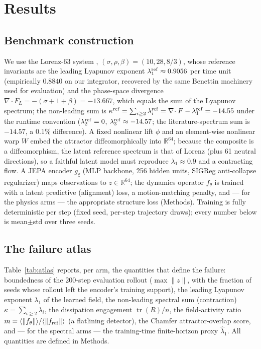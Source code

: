 \documentclass[11pt]{article}
\newcommand{\R}{\mathbb{R}}
\newcommand{\tr}{\operatorname{tr}}
\newcommand{\grad}{\nabla}
\begin{document}
\section{Results}
\label{sec:results}

\subsection{Benchmark construction}
\label{sec:bench}

We use the Lorenz-63 system \cite{lorenz1963deterministic},
$(\sigma,\rho,\beta)=(10,28,8/3)$, whose reference invariants are the
leading Lyapunov exponent $\lambda_1^{\rm ref}\approx 0.9056$ per time
unit (empirically $0.8840$ on our integrator, recovered by the same
Benettin machinery used for evaluation) and the phase-space divergence
$\grad\!\cdot F_L=-(\sigma+1+\beta)=-13.667$, which equals the sum of the
Lyapunov spectrum; the non-leading sum is $\kappa^{\rm ref}=\sum_{i\ge2}
\lambda_i^{\rm ref}=\grad\!\cdot F-\lambda_1^{\rm ref}=-14.55$ under the
runtime convention ($\lambda_2^{\rm ref}=0$, $\lambda_3^{\rm ref}
\approx-14.57$; the literature-spectrum sum is $-14.57$, a $0.1\%$
difference). A fixed nonlinear lift $\phi$ and an element-wise
nonlinear warp $W$ embed the attractor diffeomorphically into $\R^{64}$;
because the composite is a diffeomorphism, the latent reference spectrum
is that of Lorenz (plus 61 neutral directions), so a faithful latent
model must reproduce $\lambda_1\approx0.9$ and a contracting flow. A JEPA
encoder $g_\xi$ (MLP backbone, 256 hidden units, SIGReg
\cite{bardes2024sigreg} anti-collapse regularizer) maps observations to
$z\in\R^{64}$; the dynamics operator $f_\theta$ is trained with a latent
predictive (alignment) loss, a motion-matching penalty, and --- for the
physics arms --- the appropriate structure loss (Methods). Training is
fully deterministic per step (fixed seed, per-step trajectory draws);
every number below is mean$\pm$std over three seeds.

\subsection{The failure atlas}
\label{sec:atlas}

Table~\ref{tab:atlas} reports, per arm, the quantities that define the
failure: boundedness of the 200-step evaluation rollout ($\max\|z\|$,
with the fraction of seeds whose rollout left the encoder's training
support), the leading Lyapunov exponent $\lambda_1$ of the learned field,
the non-leading spectral sum (contraction) $\kappa=\sum_{i\ge2}\lambda_i$,
the dissipation engagement $\tr(R)/n$, the field-activity ratio
$m=\langle\|f_\theta\|\rangle/\langle\|f_{\rm ref}\|\rangle$ (a
flatlining detector), the Chamfer attractor-overlap score, and --- for
the spectral arms --- the training-time finite-horizon proxy
$\hat\lambda_1$. All quantities are defined in Methods.
\end{document}

